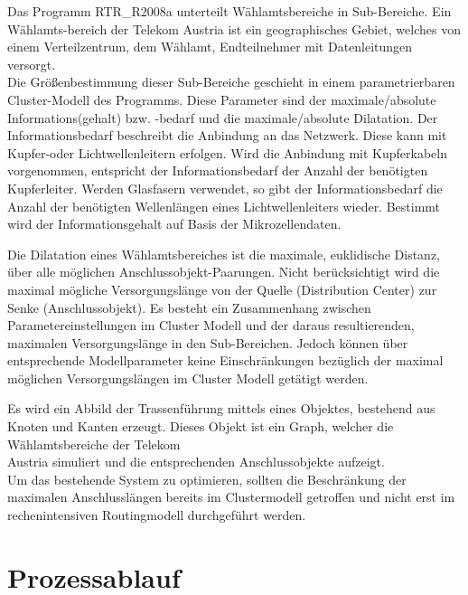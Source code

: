 \vspace{0.5cm}

\par Das Programm RTR\_R2008a unterteilt Wählamtsbereiche in Sub-Bereiche. Ein Wählamts-bereich der Telekom Austria ist ein geographisches Gebiet, 
welches von einem Verteilzentrum, dem Wählamt, Endteilnehmer mit Datenleitungen versorgt. 
\\Die Größenbestimmung dieser Sub-Bereiche geschieht in
einem parametrierbaren Cluster-Modell des Programms. 
Diese Parameter sind der maximale/absolute Informations(gehalt) bzw. -bedarf und die maximale/absolute Dilatation.
Der Informationsbedarf beschreibt die Anbindung an das Netzwerk. Diese kann mit Kupfer-oder Lichtwellenleitern
erfolgen. Wird die Anbindung mit Kupferkabeln vorgenommen, entspricht der Informationsbedarf der Anzahl der benötigten Kupferleiter. 
Werden Glasfasern verwendet, so gibt der Informationsbedarf die Anzahl der benötigten Wellenlängen eines Lichtwellenleiters wieder. Bestimmt wird 
der Informationsgehalt auf Basis der Mikrozellendaten. 

\vspace{0.5cm}

Die Dilatation eines Wählamtsbereiches ist die maximale, euklidische Distanz, über alle möglichen
Anschlussobjekt-Paarungen.
Nicht berücksichtigt wird die maximal mögliche Versorgungslänge von der Quelle (Distribution Center) zur Senke (Anschlussobjekt). 
Es besteht ein Zusammenhang zwischen Parametereinstellungen im Cluster Modell und der daraus resultierenden, maximalen Versorgungslänge in den 
Sub-Bereichen.
Jedoch können über entsprechende Modellparameter keine Einschränkungen bezüglich der maximal möglichen Versorgungslängen im Cluster Modell getätigt
werden\cite{tech_rep_1}.

Es wird ein Abbild der Trassenführung mittels eines Objektes, bestehend aus Knoten und Kanten erzeugt.  Dieses Objekt ist ein Graph, 
welcher die Wählamtsbereiche der Telekom\\ Austria simuliert und die entsprechenden Anschlussobjekte
aufzeigt\cite{pinkafeld1}.
\\

Um das bestehende System zu optimieren, sollten die Beschränkung der maximalen Anschlusslängen bereits im Clustermodell getroffen und nicht erst 
im rechenintensiven Routingmodell durchgeführt werden. 

\section{Prozessablauf}
\label{sec:1einleitung}


